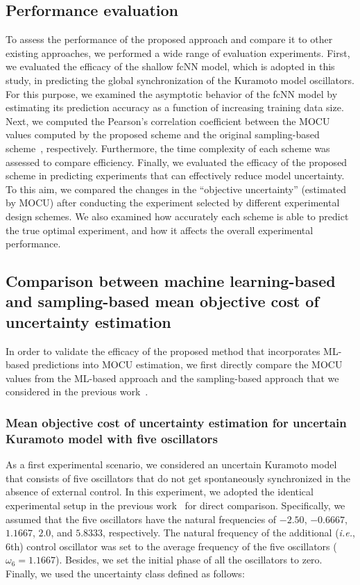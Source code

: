 \documentclass{article}
\begin{document}
\subsection{Performance evaluation}
To assess the performance of the proposed approach and compare it to other existing approaches, we performed a wide range of evaluation experiments. First, we evaluated the efficacy of the shallow fcNN model, which is adopted in this study, in predicting the global synchronization of the Kuramoto model oscillators. For this purpose, we examined the asymptotic behavior of the fcNN model by estimating its prediction accuracy as a function of increasing training data size. Next, we computed the Pearson's correlation coefficient between the MOCU values computed by the proposed scheme and the original sampling-based scheme~\cite{Hong2021}, respectively. Furthermore, the time complexity of each scheme was assessed to compare efficiency. Finally, we evaluated the efficacy of the proposed scheme in predicting experiments that can effectively reduce model uncertainty. To this aim, we compared the changes in the ``objective uncertainty'' (estimated by MOCU) after conducting the experiment selected by different experimental design schemes. We also examined how accurately each scheme is able to predict the true optimal experiment, and how it affects the overall experimental performance.

\subsection{Comparison between machine learning-based and sampling-based mean objective cost of uncertainty estimation}

In order to validate the efficacy of the proposed method that incorporates ML-based predictions into MOCU estimation, we first directly compare the MOCU values from the ML-based approach and the sampling-based approach that we considered in the previous work~\cite{Hong2021}.

\subsubsection{Mean objective cost of uncertainty estimation for uncertain Kuramoto model with five oscillators}
\label{MOCU5}
As a first experimental scenario, we considered an uncertain Kuramoto model that consists of five oscillators that do not get spontaneously synchronized in the absence of external control. In this experiment, we adopted the identical experimental setup in the previous work~\cite{Hong2021} for direct comparison. Specifically, we assumed that the five oscillators have the natural frequencies of ${-2.50}$, ${-0.6667}$, ${1.1667}$, ${2.0}$, and ${5.8333}$, respectively. The natural frequency of the additional (\textit{i.e.}, $6$th) control oscillator was set to the average frequency of the five oscillators (${\omega_{6} = 1.1667}$). Besides, we set the initial phase of all the oscillators to zero. Finally, we used the uncertainty class defined as follows:
\end{document}
